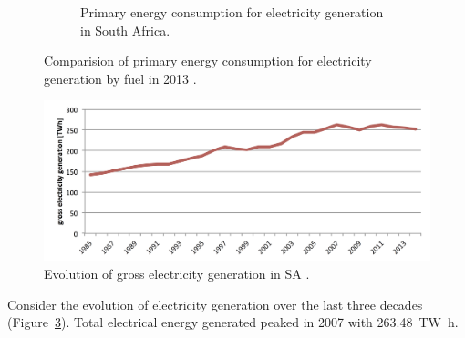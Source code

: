 \begin{figure}[!htbp]
\begin{subfigure}[b]{0.45\textwidth}
                \caption{Primary energy consumption for electricity generation in South Africa.}\label{ElectrSA}
        \end{subfigure}
\caption[Comparision of primary energy consumption for electricity generation by fuel in 2013.]{Comparision of primary energy consumption for electricity generation by fuel in 2013 \cite{Agency2015}.}\label{Electr}
\end{figure}

\begin{figure}[htbp]  
\centering
\includegraphics[width=1\linewidth]{FIG/electrGross}
\caption[Evolution of gross electricity generation in SA.]{Evolution of gross electricity generation in SA \cite{BP2015c}.}\label{electrGross}
\end{figure}
Consider the evolution of electricity generation over the last three decades (Figure~\ref{electrGross}). Total electrical energy generated peaked in 2007 with \SI{263,48}{\tera\watt\hour}. \cite{BP2015c} 

